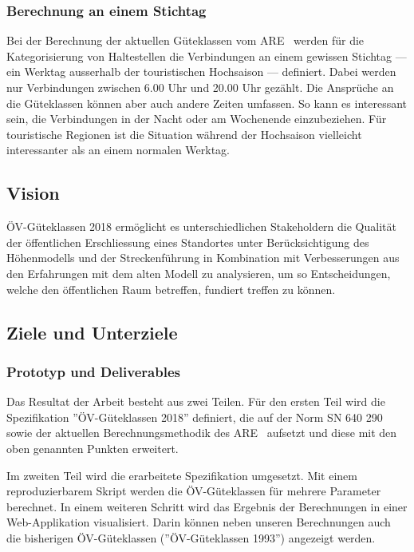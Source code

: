 \subsubsection{Berechnung an einem Stichtag}
\label{problem:Berechnung an einem Stichtag}

Bei der Berechnung der aktuellen Güteklassen vom \ac{ARE}~\cite{berechnung_are} werden für die Kategorisierung von Haltestellen die Verbindungen an einem gewissen Stichtag --- ein Werktag ausserhalb der touristischen Hochsaison --- definiert.
Dabei werden nur Verbindungen zwischen 6.00 Uhr und 20.00 Uhr gezählt.
Die Ansprüche an die Güteklassen können aber auch andere Zeiten umfassen.
So kann es interessant sein, die Verbindungen in der Nacht oder am Wochenende einzubeziehen.
Für touristische Regionen ist die Situation während der Hochsaison vielleicht interessanter als an einem normalen Werktag.

\subsection{Vision}
\label{Einführung:Vision}

\acs{ÖV}-Güteklassen 2018 ermöglicht es unterschiedlichen Stakeholdern die Qualität der öffentlichen Erschliessung eines Standortes unter Berücksichtigung des Höhenmodells und der Streckenführung in Kombination mit Verbesserungen aus den Erfahrungen mit dem alten Modell zu analysieren, um so Entscheidungen, welche den öffentlichen Raum betreffen, fundiert treffen zu können.

\subsection{Ziele und Unterziele}
\label{Einführung:Ziele und Unterziele}


\subsubsection{Prototyp und Deliverables}
\label{Ziele und Unterziele:Prototyp und Deliverables}

Das Resultat der Arbeit besteht aus zwei Teilen.
Für den ersten Teil wird die Spezifikation ''\acs{ÖV}-Güteklassen 2018'' definiert, die auf der Norm SN 640 290~\cite{sn640290} sowie der aktuellen Berechnungsmethodik des \ac{ARE}~\cite{berechnung_are} aufsetzt und diese mit den oben genannten Punkten erweitert.

Im zweiten Teil wird die erarbeitete Spezifikation umgesetzt.
Mit einem reproduzierbarem Skript werden die \acs{ÖV}-Güteklassen für mehrere Parameter berechnet.
In einem weiteren Schritt wird das Ergebnis der Berechnungen in einer Web-Applikation visualisiert.
Darin können neben unseren Berechnungen auch die bisherigen \acs{ÖV}-Güteklassen (''\acs{ÖV}-Güteklassen 1993'') angezeigt werden.

